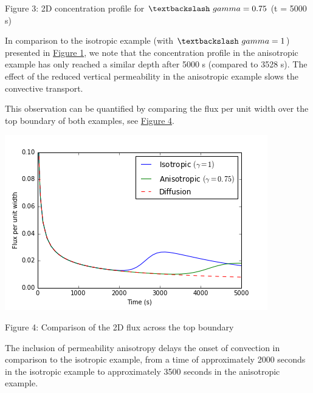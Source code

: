 \documentclass[12pt]{article}
\begin{document}
\par
Figure 3: 2D concentration profile for $\textbackslash~gamma = 0.75$ (t = 5000 s)
\par
In comparison to the isotropic example (with $\textbackslash~gamma = 1$) presented in \href{#Figure}{Figure 1}, we note that the concentration profile in the anisotropic example
has only reached a similar depth after 5000 s (compared to 3528 s). The effect of the reduced vertical permeability in the anisotropic example slows the convective transport.
\par
This observation can be quantified by comparing the flux per unit width over the top boundary of both examples, see \href{#Figure}{Figure 4}.
\par
\includegraphics[width=\linewidth]{media/2Dfluxcomp.png}

\par
Figure 4: Comparison of the 2D flux across the top boundary
\par
The inclusion of permeability anisotropy delays the onset of convection in comparison to the isotropic example, from a time of approximately 2000 seconds in the isotropic example
to approximately 3500 seconds in the anisotropic example.
\end{document}
